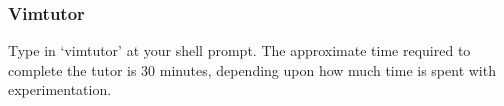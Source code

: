 \begin{frame}[fragile]
  \frametitle{Vimtutor}
  Type in `vimtutor' at your shell prompt.
  \vspace{1cm}
  The approximate time required to complete the tutor is 30 minutes, depending
  upon how much time is spent with experimentation.
\end{frame}
